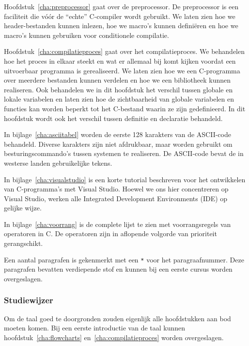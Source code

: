 Hoofdstuk~\ref{cha:preprocessor} gaat over de preprocessor. De preprocessor is een faciliteit die vóór de ``echte'' C-compiler wordt gebruikt. We laten zien hoe we header-bestanden kunnen inlezen, hoe we macro's kunnen definiëren en hoe we macro's kunnen gebruiken voor conditionele compilatie.

Hoofdstuk~\ref{cha:compilatieproces} gaat over het compilatieproces. We behandelen hoe het proces in elkaar steekt en wat er allemaal bij komt kijken voordat een uitvoerbaar programma is gerealiseerd. We laten zien hoe we een C-programma over meerdere bestanden kunnen verdelen en hoe we een bibliotheek kunnen realiseren. Ook behandelen we in dit hoofdstuk het verschil tussen globale en lokale variabelen en laten zien hoe de zichtbaarheid van globale variabelen en functies kan worden beperkt tot het C-bestand waarin ze zijn gedefinieerd. In dit hoofdstuk wordt ook het verschil tussen definitie en declaratie behandeld.
 
In bijlage~\ref{cha:asciitabel} worden de eerste 128 karakters van de ASCII-code behandeld. Diverse karakters zijn niet afdrukbaar, maar worden gebruikt om besturingscommando's tussen systemen te realiseren. De ASCII-code bevat de in westerse landen gebruikelijke tekens.

In bijlage~\ref{cha:visualstudio} is een korte tutorial beschreven voor het ontwikkelen van C-programma's met Visual Studio. Hoewel we ons hier concentreren op Visual Studio, werken alle Integrated Development Environments (IDE) op gelijke wijze.

In bijlage~\ref{cha:voorrang} is de complete lijst te zien met voorrangsregels van operatoren in C. De operatoren zijn in aflopende volgorde van prioriteit gerangschikt.

Een aantal paragrafen is gekenmerkt met een \texttt{*} voor het paragraafnummer. Deze paragrafen bevatten verdiepende stof en kunnen bij een eerste cursus worden overgeslagen.

\subsubsection*{Studiewijzer}
Om de taal goed te doorgronden zouden eigenlijk alle hoofdstukken aan bod moeten komen. Bij een eerste introductie van de taal kunnen hoofdstuk~\ref{cha:flowcharts} en~\ref{cha:compilatieproces} worden overgeslagen.

